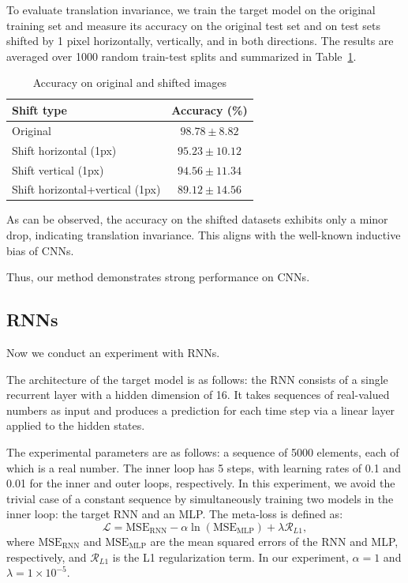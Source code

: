 \documentclass{article}
\begin{document}
To evaluate translation invariance, we train the target model on the original training set and measure its accuracy on the original test set and on test sets shifted by 1 pixel horizontally, vertically, and in both directions. The results are averaged over 1000 random train-test splits and summarized in Table~\ref{tab:shift_experiment}.

\begin{table}[h!]
\centering
\caption{Accuracy on original and shifted images}
\label{tab:shift_experiment}
\begin{tabular}{l c}
\hline
\textbf{Shift type} & \textbf{Accuracy (\%)} \\
\hline
Original           & $98.78 \pm 8.82$ \\
Shift horizontal (1px) & $95.23 \pm 10.12$ \\
Shift vertical (1px)   & $94.56 \pm 11.34$ \\
Shift horizontal+vertical (1px) & $89.12 \pm 14.56$ \\
\hline
\end{tabular}
\end{table}

As can be observed, the accuracy on the shifted datasets exhibits only a minor drop, indicating translation invariance. This aligns with the well-known inductive bias of CNNs.

Thus, our method demonstrates strong performance on CNNs.

\subsection{RNNs}
Now we conduct an experiment with RNNs.

The architecture of the target model is as follows: the RNN consists of a single recurrent layer with a hidden dimension of 16. It takes sequences of real-valued numbers as input and produces a prediction for each time step via a linear layer applied to the hidden states.

The experimental parameters are as follows: a sequence of 5000 elements, each of which is a real number. The inner loop has 5 steps, with learning rates of 0.1 and 0.01 for the inner and outer loops, respectively. 
In this experiment, we avoid the trivial case of a constant sequence by simultaneously training two models in the inner loop: the target RNN and an MLP. The meta-loss is defined as:
\[
\mathcal{L} = \text{MSE}_{\text{RNN}} - \alpha \ln(\text{MSE}_{\text{MLP}}) + \lambda \mathcal{R}_{L1},
\]
where \(\text{MSE}_{\text{RNN}}\) and \(\text{MSE}_{\text{MLP}}\) are the mean squared errors of the RNN and MLP, respectively, and \(\mathcal{R}_{L1}\) is the L1 regularization term. In our experiment, \(\alpha = 1\) and \(\lambda = 1 \times 10^{-5}\).
\end{document}
